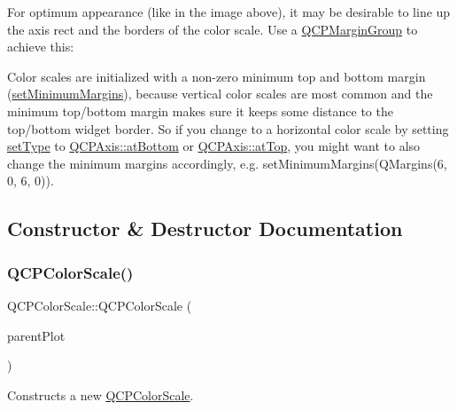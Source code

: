 For optimum appearance (like in the image above), it may be desirable to line up the axis rect and the borders of the color scale. Use a \hyperlink{class_q_c_p_margin_group}{Q\+C\+P\+Margin\+Group} to achieve this\+: 
\begin{DoxyCodeInclude}
\end{DoxyCodeInclude}
 Color scales are initialized with a non-\/zero minimum top and bottom margin (\hyperlink{class_q_c_p_layout_element_a0a8a17abc16b7923159fcc7608f94673}{set\+Minimum\+Margins}), because vertical color scales are most common and the minimum top/bottom margin makes sure it keeps some distance to the top/bottom widget border. So if you change to a horizontal color scale by setting \hyperlink{class_q_c_p_color_scale_a1bf9bdb291927c422dd66b404b206f1f}{set\+Type} to \hyperlink{class_q_c_p_axis_ae2bcc1728b382f10f064612b368bc18aa220d68888516b6c3b493d144f1ba438f}{Q\+C\+P\+Axis\+::at\+Bottom} or \hyperlink{class_q_c_p_axis_ae2bcc1728b382f10f064612b368bc18aac0ece2b680d3f545e701f75af1655977}{Q\+C\+P\+Axis\+::at\+Top}, you might want to also change the minimum margins accordingly, e.\+g. {\ttfamily set\+Minimum\+Margins(\+Q\+Margins(6, 0, 6, 0))}. 

\subsection{Constructor \& Destructor Documentation}
\mbox{\label{class_q_c_p_color_scale_aa8debce1be38b54287c04d4f584394b4}} 
\subsubsection{\texorpdfstring{Q\+C\+P\+Color\+Scale()}{QCPColorScale()}}
{\footnotesize\ttfamily Q\+C\+P\+Color\+Scale\+::\+Q\+C\+P\+Color\+Scale (\begin{DoxyParamCaption}\item[{\hyperlink{class_q_custom_plot}{Q\+Custom\+Plot} $\ast$}]{parent\+Plot }\end{DoxyParamCaption})\hspace{0.3cm}{\ttfamily [explicit]}}

Constructs a new \hyperlink{class_q_c_p_color_scale}{Q\+C\+P\+Color\+Scale}. \mbox{\label{class_q_c_p_color_scale_a49d8d2d155c15fa315fdc0427194c9ea}} 
